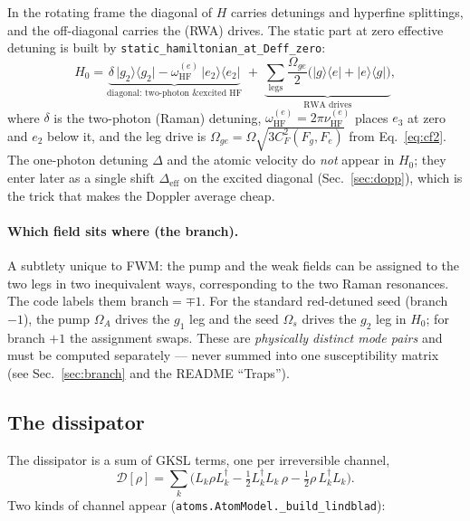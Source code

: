 \documentclass[11pt]{article}
\newcommand{\ketbra}[2]{\lvert #1 \rangle\!\langle #2 \rvert}
\newcommand{\eff}{\mathrm{eff}}
\newcommand{\HF}{\mathrm{HF}}
\newcommand{\code}[1]{\texttt{#1}}
\newcommand{\Dcal}{\mathcal{D}}
\begin{document}
In the rotating frame the diagonal of $H$ carries detunings and hyperfine
splittings, and the off-diagonal carries the (RWA) drives. The static part at zero
effective detuning is built by
\code{static\_hamiltonian\_at\_Deff\_zero}:
\begin{equation}
H_0=
\underbrace{\delta\,\ketbra{g_2}{g_2}
-\omega^{(e)}_{\HF}\,\ketbra{e_2}{e_2}}_{\text{diagonal: two-photon \& excited HF}}
\;+\;
\underbrace{\sum_{\text{legs}}\frac{\Omega_{ge}}{2}\big(\ketbra{g}{e}+\ketbra{e}{g}\big)}_{\text{RWA drives}},
\label{eq:H0}
\end{equation}
where $\delta$ is the two-photon (Raman) detuning, $\omega^{(e)}_{\HF}=2\pi
\nu^{(e)}_{\HF}$ places $e_3$ at zero and $e_2$ below it, and the leg drive is
$\Omega_{ge}=\Omega\sqrt{3 C_F^2(F_g,F_e)}$ from Eq.~\eqref{eq:cf2}. The one-photon
detuning $\Delta$ and the atomic velocity do \emph{not} appear in $H_0$; they enter
later as a single shift $\Delta_\eff$ on the excited diagonal (Sec.~\ref{sec:dopp}),
which is the trick that makes the Doppler average cheap.

\paragraph{Which field sits where (the branch).} A subtlety unique to FWM: the
pump and the weak fields can be assigned to the two legs in two inequivalent ways,
corresponding to the two Raman resonances. The code labels them
$\text{branch}=\mp1$. For the standard red-detuned seed (branch $-1$), the pump
$\Omega_A$ drives the $g_1$ leg and the seed $\Omega_s$ drives the $g_2$ leg in
$H_0$; for branch $+1$ the assignment swaps. These are \emph{physically distinct
mode pairs} and must be computed separately --- never summed into one
susceptibility matrix (see Sec.~\ref{sec:branch} and the README ``Traps'').

\subsection{The dissipator}
\label{sec:diss}

The dissipator is a sum of GKSL terms, one per irreversible channel,
\begin{equation}
\Dcal[\rho]=\sum_k\Big(L_k\rho L_k^\dagger
   -\tfrac12 L_k^\dagger L_k\,\rho-\tfrac12\rho\,L_k^\dagger L_k\Big).
\label{eq:lindblad}
\end{equation}
Two kinds of channel appear (\code{atoms.AtomModel.\_build\_lindblad}):
\end{document}
